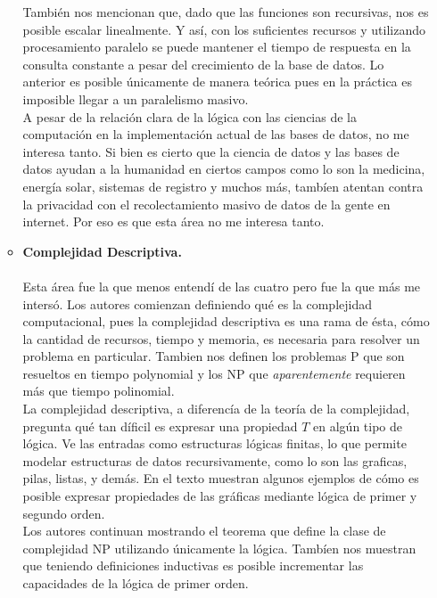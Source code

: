 \documentclass[8pt, letterpaper]{article}
\begin{document}
\begin{enumerate}
\begin{itemize}
    \hspace*{1cm} También nos mencionan que, dado que las funciones son recursivas, nos es posible escalar linealmente. Y así, con los suficientes recursos y utilizando procesamiento paralelo se puede mantener el tiempo de respuesta en la consulta constante a pesar del crecimiento de la base de datos. Lo anterior es posible únicamente de manera teórica pues en la práctica es imposible llegar a un paralelismo masivo.\\
    \hspace*{1cm} A pesar de la relación clara de la lógica con las ciencias de la computación en la implementación actual de las bases de datos, no me interesa tanto. Si bien es cierto que la ciencia de datos y las bases de datos ayudan a la humanidad en ciertos campos como lo son la medicina, energía solar, sistemas de registro y muchos más, tambíen atentan contra la privacidad con el recolectamiento masivo de datos de la gente en internet. Por eso es que esta área no me interesa tanto.\\
    \newpage
  \item\textbf{Complejidad Descriptiva.}\\\\
    Esta área fue la que menos entendí de las cuatro pero fue la que más me intersó. Los autores comienzan definiendo qué es la complejidad computacional, pues la complejidad descriptiva es una rama de ésta, cómo la cantidad de recursos, tiempo y memoria, es necesaria para resolver un problema en particular. Tambien nos definen los problemas P que son resueltos en tiempo polynomial y los NP que \textit{aparentemente} requieren más que tiempo polinomial. \\
    \hspace*{1cm} La complejidad descriptiva, a diferencía de la teoría de la complejidad, pregunta qué tan díficil es expresar una propiedad $T$ en algún tipo de lógica. Ve las entradas como estructuras lógicas finitas, lo que permite modelar estructuras de datos recursivamente, como lo son las graficas, pilas, listas, y demás. En el texto muestran algunos ejemplos de cómo es posible expresar propiedades de las gráficas mediante lógica de primer y segundo orden.\\
    \hspace*{1cm} Los autores continuan mostrando el teorema que define la clase de complejidad NP utilizando únicamente la lógica. Tambíen nos muestran que teniendo definiciones inductivas es posible incrementar las capacidades de la lógica de primer orden.\\

\end{itemize}
\end{enumerate}
\end{document}
